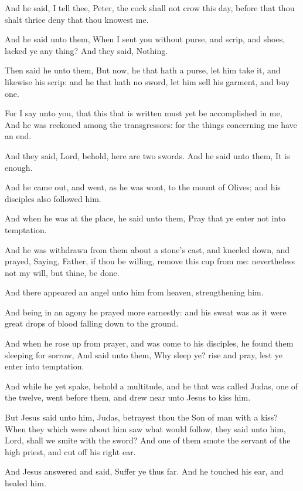 \verse And he said, I tell thee, Peter, the cock shall not crow this day, before that thou shalt thrice deny that thou knowest me.

\verse And he said unto them, When I sent you without purse, and scrip, and shoes, lacked ye any thing? And they said, Nothing.

\verse Then said he unto them, But now, he that hath a purse, let him take it, and likewise his scrip: and he that hath no sword, let him sell his garment, and buy one.

\verse For I say unto you, that this that is written must yet be accomplished in me, And he was reckoned among the transgressors: for the things concerning me have an end.

\verse And they said, Lord, behold, here are two swords. And he said unto them, It is enough.

\verse And he came out, and went, as he was wont, to the mount of Olives; and his disciples also followed him.

\verse And when he was at the place, he said unto them, Pray that ye enter not into temptation.

\verse And he was withdrawn from them about a stone's cast, and kneeled down, and prayed, \verse Saying, Father, if thou be willing, remove this cup from me: nevertheless not my will, but thine, be done.

\verse And there appeared an angel unto him from heaven, strengthening him.

\verse And being in an agony he prayed more earnestly: and his sweat was as it were great drops of blood falling down to the ground.

\verse And when he rose up from prayer, and was come to his disciples, he found them sleeping for sorrow, \verse And said unto them, Why sleep ye? rise and pray, lest ye enter into temptation.

\verse And while he yet spake, behold a multitude, and he that was called Judas, one of the twelve, went before them, and drew near unto Jesus to kiss him.

\verse But Jesus said unto him, Judas, betrayest thou the Son of man with a kiss?  \verse When they which were about him saw what would follow, they said unto him, Lord, shall we smite with the sword?  \verse And one of them smote the servant of the high priest, and cut off his right ear.

\verse And Jesus answered and said, Suffer ye thus far. And he touched his ear, and healed him.

